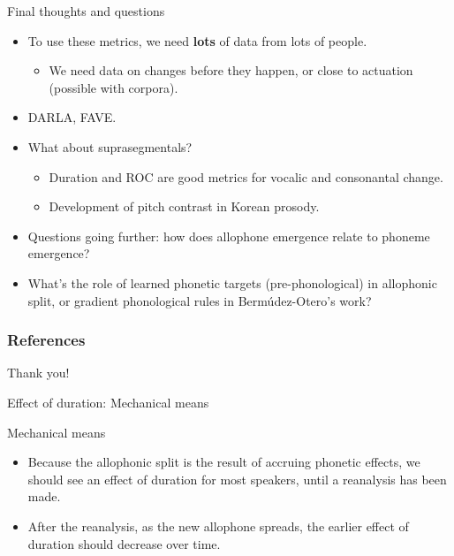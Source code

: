 \documentclass[hyperref={pdfpagelabels=false}]{beamer}
\newcommand{\bonusbegin}{
   \newcounter{finalframe}
   \setcounter{finalframe}{\value{framenumber}}
}
\begin{document}
\begin{frame}{Final thoughts and questions}
	\begin{itemize}
		\item To use these metrics, we need \textbf{lots} of data from lots of people. \pause
			\begin{itemize}
			\item We need data on changes before they happen, or close to actuation (possible with corpora). \pause
			\end{itemize}
		\item DARLA, FAVE. \pause
		\item What about suprasegmentals?
			\begin{itemize}
			\item Duration and ROC are good metrics for vocalic and consonantal change. \pause
			\item \cite{Cho2015} Development of pitch contrast in Korean prosody. \pause 
			\end{itemize}		
		\item Questions going further: how does allophone emergence relate to phoneme emergence?
		\item What's the role of learned phonetic targets (pre-phonological) in allophonic split, or gradient phonological rules in Bermúdez-Otero's work?
	\end{itemize}
\end{frame}

\begin{frame}[allowframebreaks]
\frametitle{References}



\end{frame}

\begin{frame}
\begin{center}
\huge{Thank you!}
\end{center}
\end{frame}

\bonusbegin

\begin{frame}[noframenumbering]{Effect of duration: Mechanical means}
	\begin{block}{Mechanical means}
		\begin{itemize}
			\item Because the allophonic split is the result of accruing phonetic effects, we should see an effect of duration for most speakers, until a reanalysis has been made.
			\item After the reanalysis, as the new allophone spreads, the earlier effect of duration should decrease over time.
		\end{itemize}
	\end{block}	
\end{frame} 
\end{document}
